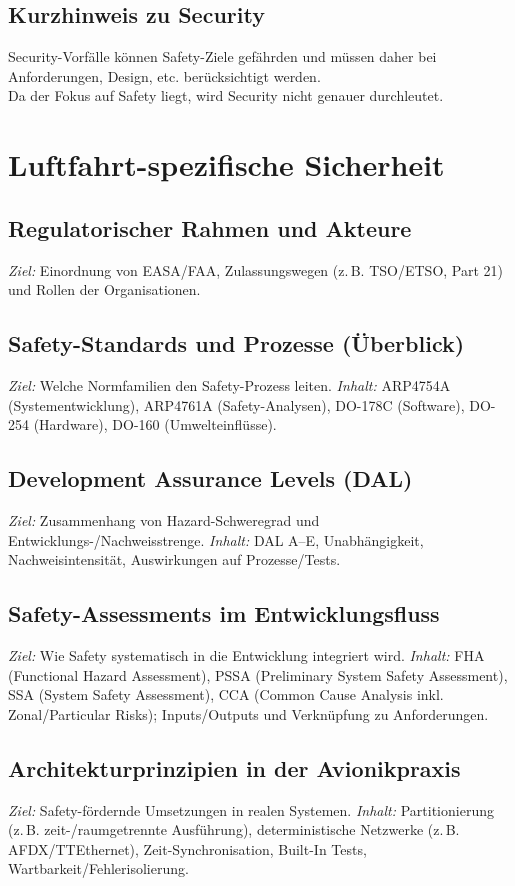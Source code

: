 \subsection{Kurzhinweis zu Security}
Security-Vorfälle können Safety-Ziele gefährden und müssen daher bei Anforderungen, Design, etc. berücksichtigt werden. \\
Da der Fokus auf Safety liegt, wird Security nicht genauer durchleutet.


\section{Luftfahrt-spezifische Sicherheit}

\subsection{Regulatorischer Rahmen und Akteure}
\textit{Ziel:} Einordnung von EASA/FAA, Zulassungswegen (z.\,B. TSO/ETSO, Part 21) und Rollen der Organisationen.

\subsection{Safety-Standards und Prozesse (Überblick)}
\textit{Ziel:} Welche Normfamilien den Safety-Prozess leiten.
\textit{Inhalt:} ARP4754A (Systementwicklung), ARP4761A (Safety-Analysen), DO-178C (Software), DO-254 (Hardware), DO-160 (Umwelteinflüsse).

\subsection{Development Assurance Levels (DAL)}
\textit{Ziel:} Zusammenhang von Hazard-Schweregrad und Entwicklungs-/Nachweisstrenge.
\textit{Inhalt:} DAL A–E, Unabhängigkeit, Nachweisintensität, Auswirkungen auf Prozesse/Tests.

\subsection{Safety-Assessments im Entwicklungsfluss}
\textit{Ziel:} Wie Safety systematisch in die Entwicklung integriert wird.
\textit{Inhalt:} FHA (Functional Hazard Assessment), PSSA (Preliminary System Safety Assessment), SSA (System Safety Assessment),
CCA (Common Cause Analysis inkl. Zonal/Particular Risks); Inputs/Outputs und Verknüpfung zu Anforderungen.

\subsection{Architekturprinzipien in der Avionikpraxis}
\textit{Ziel:} Safety-fördernde Umsetzungen in realen Systemen.
\textit{Inhalt:} Partitionierung (z.\,B. zeit-/raumgetrennte Ausführung), deterministische Netzwerke (z.\,B. AFDX/TTEthernet), Zeit-Synchronisation,
Built-In Tests, Wartbarkeit/Fehlerisolierung.

